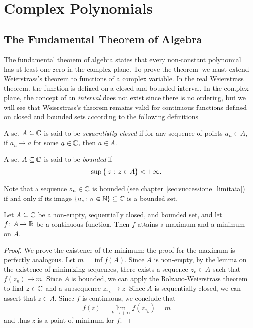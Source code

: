 \section{Complex Polynomials}
\label{ch:ancora_polinomi}

\subsection{The Fundamental Theorem of Algebra}

The fundamental theorem of algebra states that every non-constant polynomial has
at least one zero in the complex plane.
To prove the theorem, we must extend Weierstrass's theorem to functions of a
complex variable.
In the real Weierstrass theorem, the function is defined on a closed and bounded
interval.
In the complex plane, the concept of an \emph{interval} does not exist since
there is no ordering, but we will see that Weierstrass's theorem remains valid
for continuous functions defined on closed and bounded sets according to the
following definitions.

\begin{definition}
A set $A\subseteq {\mathbb C}$ is said to be \emph{sequentially closed}
%
%
if for any sequence of points $a_n\in A$, if $a_n \to a$ for some $a\in {\mathbb C}$,
then $a\in A$.
\end{definition}

\begin{definition}[Boundedness]
A set $A\subseteq {\mathbb C}$ is said to be \emph{bounded}%
%
if
\[
  \sup {\left\{  {\left|z\right|}\colon z \in A \right\}} < +\infty.
\]
\end{definition}

Note that a sequence $a_n\in {\mathbb C}$ is bounded (see
chapter~\ref{sec:successione_limitata}) if and only if its image
${\left\{ a_n\colon n\in {\mathbb N} \right\}}\subseteq {\mathbb C}$ is a bounded set.

\begin{theorem}
Let $A\subseteq {\mathbb C}$ be a non-empty, sequentially closed, and bounded set, and let
$f\colon A \to {\mathbb R}$ be a continuous function.
Then $f$ attains a maximum and a minimum on $A$.
\end{theorem}
%
\begin{proof}
We prove the existence of the minimum; the proof for the maximum is perfectly
analogous.
Let $m=\inf f(A)$.
Since $A$ is non-empty, by the lemma on the existence of minimizing sequences,
there exists a sequence $z_n \in A$ such that $f(z_n) \to m$.
Since $A$ is bounded, we can apply the Bolzano-Weierstrass theorem to find $z\in
{\mathbb C}$ and a subsequence $z_{n_k} \to z$. Since $A$ is sequentially closed, we can
assert that $z\in A$. Since $f$ is continuous, we conclude that
\[
f(z) = \lim_{k\to+\infty} f(z_{n_k}) = m
\]
and thus $z$ is a point of minimum for $f$.
\end{proof}

